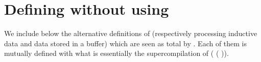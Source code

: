 \section{Defining  without using \assertTotal{}}\label{appendix:safefold}

We include below the alternative definitions of 
(respectively processing inductive data and data stored in a buffer)
which are seen as total by \idris{}.
%
Each of them is mutually defined with what is essentially
the supercompilation of
(\IdrisKeyword{\textbackslash}  \IdrisKeyword{=>}   ( )).


